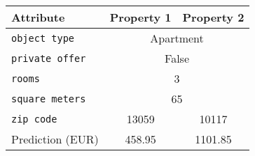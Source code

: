 \begin{center}
\begin{table}
\begin{tabular}{lcc}
\toprule
Attribute &  Property 1 & Property 2\\
\midrule
\texttt{object type} & \multicolumn{2}{c}{Apartment} \\
\texttt{private offer} & \multicolumn{2}{c}{False} \\
\texttt{rooms} & \multicolumn{2}{c}{3} \\
\texttt{square meters} & \multicolumn{2}{c}{65} \\
\texttt{zip code} & 13059 & 10117 \\
\midrule
Prediction (EUR) & 458.95 & 1101.85\\
\bottomrule
\end{tabular}
\end{table}
\end{center}